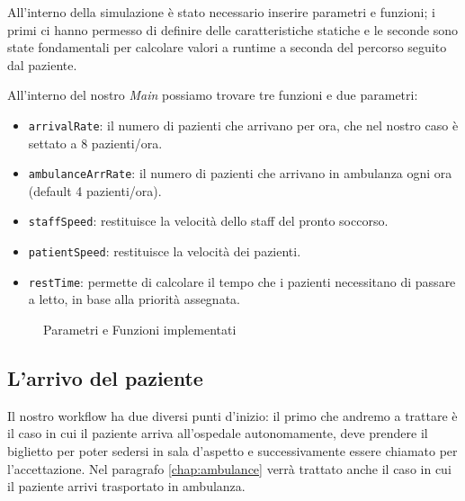 \clearpage
All'interno della simulazione è stato necessario inserire parametri e funzioni; i primi ci hanno permesso di definire delle caratteristiche statiche e le seconde sono state fondamentali per calcolare valori a runtime a seconda del percorso seguito dal paziente.  

All’interno del nostro \textit{Main} possiamo trovare tre funzioni e due parametri:
\begin{itemize}
\item \texttt{arrivalRate}: il numero di pazienti che arrivano per ora, che nel nostro caso è settato a 8 pazienti/ora.
\item \texttt{ambulanceArrRate}: il numero di pazienti che arrivano in ambulanza ogni ora (default 4 pazienti/ora). \\
\item \texttt{staffSpeed}: restituisce la velocità dello staff del pronto soccorso.
\item \texttt{patientSpeed}: restituisce  la velocità dei pazienti.
\item \texttt{restTime}: permette di calcolare il tempo che i pazienti necessitano di passare a letto, in base alla priorità assegnata.\\
\end{itemize}

\begin{figure}[!htb]
    \centering
    \caption{Parametri e Funzioni implementati}
\end{figure}
\clearpage
\subsection{L'arrivo del paziente}

Il nostro workflow ha due diversi punti d’inizio: il primo che andremo a trattare è il caso in cui il paziente arriva all'ospedale autonomamente, deve prendere il biglietto per poter sedersi in sala d’aspetto e successivamente essere chiamato per l’accettazione. Nel paragrafo \ref{chap:ambulance}  verrà trattato anche il caso in cui il paziente arrivi trasportato in ambulanza.


